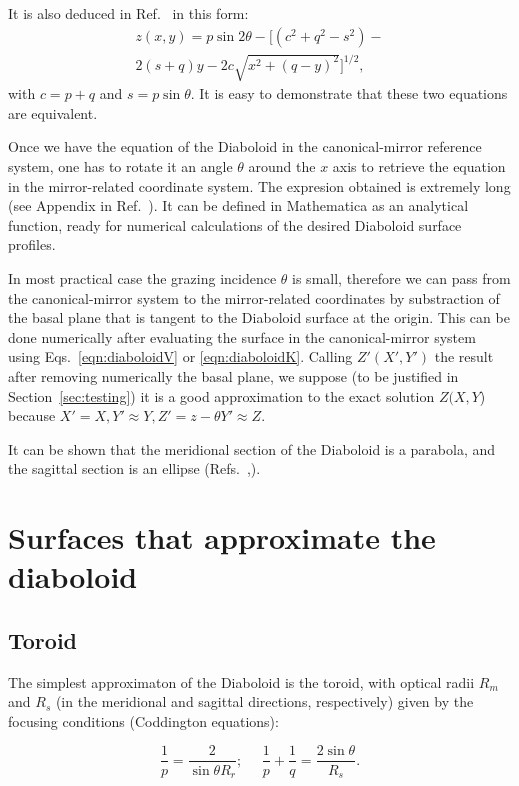 \documentclass{iucr}              %
\begin{document}
It is also deduced in Ref.~\cite{Goldberg2020} in this form:
\begin{multline}
\label{eqn:diaboloidK}
z(x,y) = p \sin2\theta - [(c^2 + q^2 - s^2) - \\
2 (s  + q) y - 2 c \sqrt{x^2 + (q-y)^2}]^{1/2},
\end{multline}
with $c=p+q$ and $s=p\sin\theta$. It is easy to demonstrate that these two equations are equivalent.

Once we have the equation of the Diaboloid in the canonical-mirror reference system, one has to rotate it an angle $\theta$ around the $x$ axis to retrieve the equation in the mirror-related coordinate system. The expresion obtained is extremely long (see Appendix in Ref.~\cite{Valeriy2020b}). It can be defined in Mathematica as an analytical function, ready for numerical calculations of the desired Diaboloid surface profiles.

In most practical case the grazing incidence $\theta$ is small, therefore we can pass from the canonical-mirror system to the mirror-related coordinates by substraction of the basal plane that is tangent to the Diaboloid surface at the origin. This can be done numerically after evaluating the surface in the canonical-mirror system using Eqs.~\ref{eqn:diaboloidV} or \ref{eqn:diaboloidK}. Calling $Z'(X',Y')$ the result after removing numerically the basal plane, we suppose (to be justified in Section~\ref{sec:testing}) it is a good approximation to the exact solution $Z(X,Y$) because $X'=X, Y'\approx Y, Z'=z - \theta Y' \approx Z$. 

It can be shown that the meridional section of the Diaboloid is a parabola, and the sagittal section is an ellipse (Refs.~\cite{Goldberg2020},\cite{Valeriy2020a}).

\section{Surfaces that approximate the diaboloid}
\label{sec:approximations}

\subsection{Toroid}
The simplest approximaton of the Diaboloid is the toroid, with optical radii $R_m$ and $R_s$ (in the meridional and sagittal directions, respectively) given by the focusing conditions (Coddington equations): 

\begin{equation}
\label{eqn:radii}
\frac{1}{p} = \frac{2 }{\sin\theta R_r};~~~~~~
\frac{1}{p} + \frac{1}{q} = \frac{2\sin\theta}{ R_s}.
\end{equation}
\end{document}
